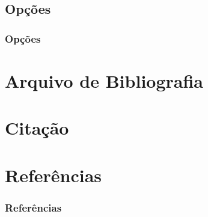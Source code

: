 \documentclass[brazilian,a4paper]{beamer}
\begin{document}
\subsection{Opções}
\begin{frame}[fragile]
    \frametitle{Opções}

    

\end{frame}

\section{Arquivo de Bibliografia}


\section{Citação}

\section{Referências}


\begin{frame}[allowframebreaks]
    \frametitle{Referências}

    \nocite{*}
    \printbibliography[keyword=inserirReferencias]

\end{frame}
\end{document}
